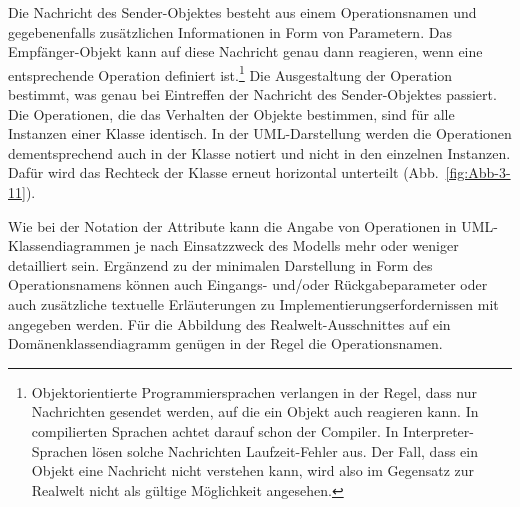 Die Nachricht des Sender-Objektes besteht aus einem Operationsnamen und gegebenenfalls zusätzlichen Informationen in Form von Parametern. Das Empfänger-Objekt kann auf diese Nachricht genau dann reagieren, wenn eine entsprechende Operation definiert ist.\footnote{Objektorientierte Programmiersprachen verlangen in der Regel, dass nur Nachrichten gesendet werden, auf die ein Objekt auch reagieren kann. In compilierten Sprachen achtet darauf schon der Compiler. In Interpreter-Sprachen lösen solche Nachrichten Laufzeit-Fehler aus. Der Fall, dass ein Objekt eine Nachricht nicht verstehen kann, wird also im Gegensatz zur Realwelt nicht als gültige Möglichkeit angesehen.} Die Ausgestaltung der Operation bestimmt, was genau bei Eintreffen der Nachricht des Sender-Objektes passiert. Die Operationen, die das Verhalten der Objekte bestimmen, sind für alle Instanzen einer Klasse identisch. 
In der UML-Darstellung werden die Operationen dementsprechend auch in der Klasse notiert und nicht in den einzelnen Instanzen. Dafür wird das Rechteck der Klasse erneut horizontal unterteilt (Abb.~\ref{fig:Abb-3-11}).

Wie bei der Notation der Attribute kann die Angabe von Operationen in UML-Klassendiagrammen je nach Einsatzzweck des Modells mehr oder weniger detailliert sein. Ergänzend zu der minimalen Darstellung in Form des Operationsnamens können auch Eingangs- und/oder Rückgabeparameter oder auch zusätzliche textuelle Erläuterungen zu Implementierungserfordernissen mit angegeben werden. Für die Abbildung des Realwelt-Ausschnittes auf ein Domänenklassendiagramm genügen in der Regel die Operationsnamen.

